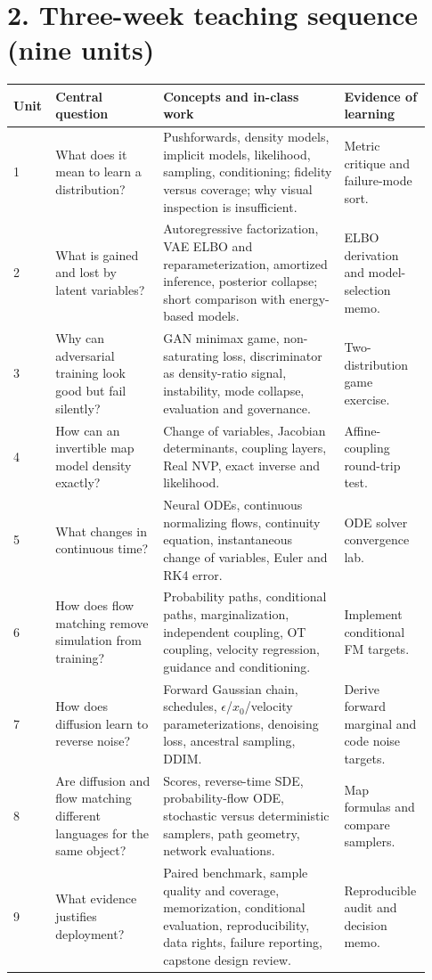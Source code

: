 \documentclass[11pt]{article}
\begin{document}
\section*{2. Three-week teaching sequence (nine units)}

\begin{longtable}{@{}p{0.08\linewidth}p{0.25\linewidth}p{0.42\linewidth}p{0.179\linewidth}@{}}
\toprule
Unit & Central question & Concepts and in-class work & Evidence of learning \\
\midrule
\endhead
1 & What does it mean to learn a distribution? & Pushforwards, density models,
implicit models, likelihood, sampling, conditioning; fidelity versus coverage;
why visual inspection is insufficient. & Metric critique and failure-mode sort. \\
2 & What is gained and lost by latent variables? & Autoregressive factorization,
VAE ELBO and reparameterization, amortized inference, posterior collapse; short
comparison with energy-based models. & ELBO derivation and model-selection memo. \\
3 & Why can adversarial training look good but fail silently? & GAN minimax game,
non-saturating loss, discriminator as density-ratio signal, instability, mode
collapse, evaluation and governance. & Two-distribution game exercise. \\
\midrule
4 & How can an invertible map model density exactly? & Change of variables,
Jacobian determinants, coupling layers, Real NVP, exact inverse and likelihood. &
Affine-coupling round-trip test. \\
5 & What changes in continuous time? & Neural ODEs, continuous normalizing flows,
continuity equation, instantaneous change of variables, Euler and RK4 error. &
ODE solver convergence lab. \\
6 & How does flow matching remove simulation from training? & Probability paths,
conditional paths, marginalization, independent coupling, OT coupling, velocity
regression, guidance and conditioning. & Implement conditional FM targets. \\
\midrule
7 & How does diffusion learn to reverse noise? & Forward Gaussian chain, schedules,
$\epsilon$/$x_0$/velocity parameterizations, denoising loss, ancestral sampling,
DDIM. & Derive forward marginal and code noise targets. \\
8 & Are diffusion and flow matching different languages for the same object? &
Scores, reverse-time SDE, probability-flow ODE, stochastic versus deterministic
samplers, path geometry, network evaluations. & Map formulas and compare samplers. \\
9 & What evidence justifies deployment? & Paired benchmark, sample quality and
coverage, memorization, conditional evaluation, reproducibility, data rights,
failure reporting, capstone design review. & Reproducible audit and decision memo. \\
\bottomrule
\end{longtable}
\end{document}
